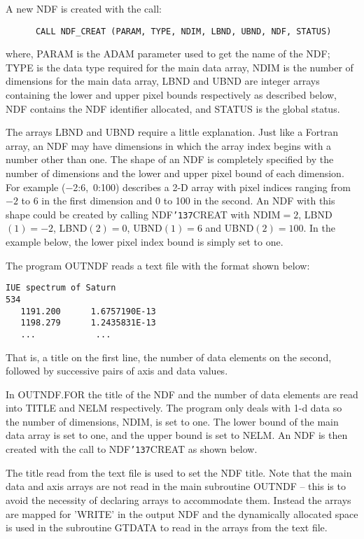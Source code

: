 \documentclass[twoside,11pt]{article}
\renewcommand{\_}{{\tt\char'137}}
\begin{document}
A new NDF is created with the call:
\begin{verbatim}
      CALL NDF_CREAT (PARAM, TYPE, NDIM, LBND, UBND, NDF, STATUS)
\end{verbatim}
where, PARAM is the ADAM parameter used to get the name of the NDF;
TYPE is the data type required for the  main data array,
NDIM is the number of dimensions for the main data array,
LBND and UBND are integer arrays containing  the lower and upper pixel bounds
respectively as described below,
NDF contains  the NDF identifier allocated, and STATUS is the global status.

The arrays LBND and UBND require a little explanation.
Just like a Fortran array, an NDF may have dimensions in which the
array index begins with a number other than one.
The shape of an NDF is completely specified by the number of dimensions
and the lower and upper pixel bound of each dimension.
For example ($-$2:6,~0:100) describes a 2-D array with pixel indices
ranging from $-2$ to 6 in the first dimension and 0 to 100 in the second.
An NDF with this shape could be created by calling NDF\_CREAT with
NDIM$=2$, LBND$(1)=-2$, LBND$(2)=0$, UBND$(1)=6$ and UBND$(2)=100$.
In the example below, the lower pixel index bound is simply set  to
one.

The program OUTNDF reads a text file with
the format  shown below:
\begin{verbatim}
IUE spectrum of Saturn
534
   1191.200      1.6757190E-13
   1198.279      1.2435831E-13
   ...            ...
\end{verbatim}
That is, a title on the first line, the number of data elements on the
second, followed by successive pairs of axis and data values.

In OUTNDF.FOR the title of the NDF and the number of data elements
are read into TITLE and NELM respectively.
The program only deals with 1-d data so the
number of dimensions, NDIM, is set to one.
The lower bound of the main data array  is set to one,
and the upper bound is set to NELM.
An NDF is then created with the call to NDF\_CREAT as shown below.

The title read from the text file is used to set the NDF title.
Note that the main data and axis arrays are not read in the main subroutine
OUTNDF --  this is to avoid the necessity of declaring arrays to accommodate
them.
Instead the arrays are mapped for 'WRITE'  in the output NDF
and the dynamically allocated space is used in
the subroutine GTDATA to read in the arrays from
the text file.
\end{document}
